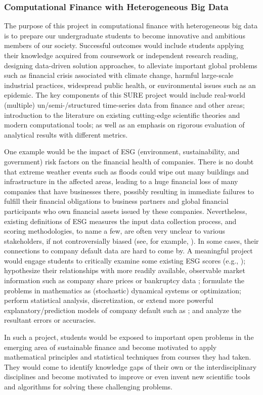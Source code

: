 
\subsubsection{Computational Finance with Heterogeneous Big Data}

The purpose of this project in computational finance with heterogeneous big data is to prepare our undergraduate students to become innovative and ambitious members of our society. Successful outcomes would include students applying their knowledge acquired from coursework or independent research reading,  designing data-driven solution approaches, to alleviate important global problems such as financial crisis associated with climate change, harmful large-scale industrial practices, widespread public health, or environmental issues such as an epidemic.  The key components of this SURE project would include real-world (multiple) un/semi-/structured time-series data from finance and other areas; introduction to the literature on existing cutting-edge scientific theories and modern computational tools; as well as an emphasis on rigorous evaluation of analytical results with different metrics. 

One example would be the impact of ESG (environment, sustainability, and government) risk factors on the financial health of companies. There is no doubt that extreme weather events such as floods could wipe out many buildings and infrastructure in the affected areas, leading to a huge financial loss of many companies that have businesses there, possibly resulting in immediate failures to fulfill their financial obligations to business partners and global financial participants who own financial assets issued by these companies. Nevertheless, existing definitions of ESG measures the input data collection process, and scoring methodologies, to name a few, are often very unclear to various stakeholders, if not controversially biased (see, for example, \cite{reiser2019buyer}). In some cases, their connections to company default data are hard to come by. A meaningful project would engage students to critically examine some existing ESG scores (e.g., \cite{friede2015esg}); hypothesize their relationships with more readily available, observable market information such as company share prices or bankruptcy data \cite{pedersen2020responsible, fatemi2018esg}; formulate the problems in mathematics as (stochastic) dynamical systems or optimization; perform statistical analysis, discretization, or extend more powerful explanatory/prediction models of company default such as \cite{jarrow2005default}; and analyze the resultant errors or accuracies. 

In such a project, students would be exposed to important open problems in the emerging area of sustainable finance and become motivated to apply mathematical principles and statistical techniques from courses they had taken. They would come to identify knowledge gaps of their own or the interdisciplinary disciplines and become motivated to improve or even invent new scientific tools and algorithms for solving these challenging problems.
